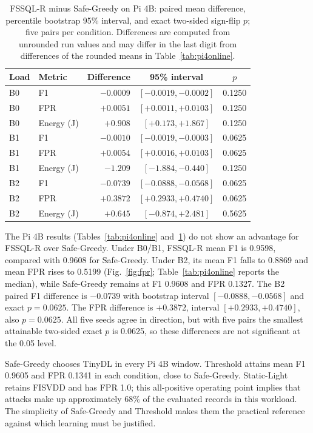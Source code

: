 \documentclass[journal]{IEEEtran}
\begin{document}
\begin{table}[t]
\caption{FSSQL-R minus Safe-Greedy on Pi 4B: paired mean difference, percentile bootstrap 95\% interval, and exact two-sided sign-flip $p$; five pairs per condition. Differences are computed from unrounded run values and may differ in the last digit from differences of the rounded means in Table~\ref{tab:pi4online}.}
\label{tab:pi4paired}
\centering\footnotesize
\begin{tabular}{@{}llrcc@{}}
\toprule
Load & Metric & Difference & 95\% interval & $p$ \\
\midrule
B0 & F1 & $-0.0009$ & $[-0.0019, -0.0002]$ & 0.1250 \\
B0 & FPR & $+0.0051$ & $[+0.0011, +0.0103]$ & 0.1250 \\
B0 & Energy (J) & $+0.908$ & $[+0.173, +1.867]$ & 0.1250 \\
\midrule
B1 & F1 & $-0.0010$ & $[-0.0019, -0.0003]$ & 0.0625 \\
B1 & FPR & $+0.0054$ & $[+0.0016, +0.0103]$ & 0.0625 \\
B1 & Energy (J) & $-1.209$ & $[-1.884, -0.440]$ & 0.1250 \\
\midrule
B2 & F1 & $-0.0739$ & $[-0.0888, -0.0568]$ & 0.0625 \\
B2 & FPR & $+0.3872$ & $[+0.2933, +0.4740]$ & 0.0625 \\
B2 & Energy (J) & $+0.645$ & $[-0.874, +2.481]$ & 0.5625 \\
\bottomrule
\end{tabular}
\end{table}

The Pi 4B results (Tables~\ref{tab:pi4online} and~\ref{tab:pi4paired}) do not show an advantage for FSSQL-R over Safe-Greedy. Under B0/B1, FSSQL-R mean F1 is 0.9598, compared with 0.9608 for Safe-Greedy. Under B2, its mean F1 falls to 0.8869 and mean FPR rises to 0.5199 (Fig.~\ref{fig:fpr}; Table~\ref{tab:pi4online} reports the median), while Safe-Greedy remains at F1 0.9608 and FPR 0.1327. The B2 paired F1 difference is $-0.0739$ with bootstrap interval $[-0.0888,-0.0568]$ and exact $p=0.0625$. The FPR difference is $+0.3872$, interval $[+0.2933,+0.4740]$, also $p=0.0625$. All five seeds agree in direction, but with five pairs the smallest attainable two-sided exact $p$ is 0.0625, so these differences are not significant at the 0.05 level.

Safe-Greedy chooses TinyDL in every Pi 4B window. Threshold attains mean F1 0.9605 and FPR 0.1341 in each condition, close to Safe-Greedy. Static-Light retains FISVDD and has FPR 1.0; this all-positive operating point implies that attacks make up approximately 68\% of the evaluated records in this workload. The simplicity of Safe-Greedy and Threshold makes them the practical reference against which learning must be justified.
\end{document}
